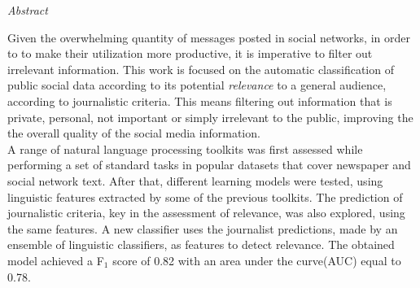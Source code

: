 \documentclass[11pt, a4paper, oneside]{thesis} %
\begin{document}


\thispagestyle{empty}
  \begin{center}
    \setlength{\parskip}{0pt}
    {\huge{\textit{Abstract}} \par}
    \bigskip
  \end{center}

Given the overwhelming quantity of messages posted in social networks, in order to to make their utilization more productive, it is imperative to filter out irrelevant information. 
This work is focused on the automatic classification of public social data according to its potential \textit{relevance} to a general audience, according to journalistic criteria. This means filtering out information that is private, personal, not important or simply irrelevant to the public, improving the the overall quality of the social media information.\\
A range of natural language processing toolkits was first assessed while performing a set of standard tasks in popular datasets that cover newspaper and social network text. After that, different learning models were tested, using linguistic features extracted by some of the previous toolkits. The prediction of journalistic criteria,  key in the assessment of relevance, was also explored, using the same features. A new classifier uses the journalist predictions, made by an ensemble of linguistic classifiers, as features to detect relevance. The obtained model achieved a F$_1$ score of 0.82 with an area under the curve(AUC) equal to 0.78. 

\end{document}
